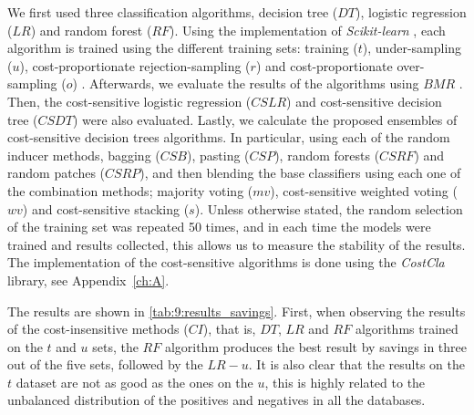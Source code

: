 {  We first used three classification algorithms, decision tree ($DT$), logistic 
  regression ($LR$) and random forest ($RF$). Using the implementation of \textit{Scikit-learn} 
  \citep{Pedregosa2011}, each algorithm is trained using the different training sets: training 
  ($t$), under-sampling ($u$), cost-proportionate rejection-sampling  ($r$) \citep{Zadrozny2003}   
  and   cost-proportionate over-sampling ($o$) \citep{Elkan2001}. Afterwards,  we evaluate the 
  results of  the algorithms using $BMR$ \citep{CorreaBahnsen2014}. Then, the cost-sensitive 
  logistic  regression ($CSLR$) \citep{CorreaBahnsen2014b} and cost-sensitive decision tree 
  ($CSDT$) \citep{CorreaBahnsen2015} were also evaluated. Lastly, we calculate the 
  proposed ensembles of cost-sensitive decision trees algorithms. In particular, using each of the 
  random inducer methods, bagging ($CSB$), pasting ($CSP$), random forests ($CSRF$) and random 
  patches ($CSRP$), and then blending the base classifiers using each one of the combination 
  methods; majority voting ($mv$), cost-sensitive weighted voting ($wv$) and cost-sensitive 
  stacking ($s$). Unless otherwise stated, the random selection of the training set was repeated 50 
  times, and in each time the models were trained and results collected, this allows us to measure 
  the stability of the results. The implementation of the cost-sensitive algorithms is done using 
  the \textit{CostCla} library, see Appendix~\ref{ch:A}.
  
    The results are shown in \tablename{ \ref{tab:9:results_savings}}. First, when observing  the 
  results of the cost-insensitive methods ($CI$), that is, $DT$, $LR$ and $RF$ algorithms trained 
  on the $t$ and $u$ sets, the $RF$ algorithm produces the best result by savings in three out of 
  the five sets, followed by the $LR-u$. It is also clear that the results on the $t$ dataset are 
  not as good as the ones on the $u$, this is highly related to the unbalanced distribution of the 
  positives and negatives in all the databases.

}
